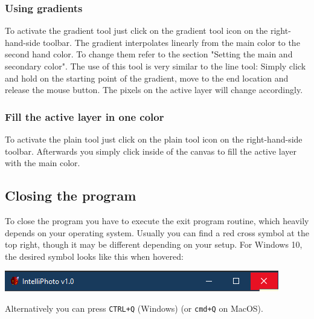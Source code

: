\documentclass[a4paper, 12pt]{article}
\begin{document}
\subsubsection{Using gradients}
To activate the gradient tool just click on the gradient tool icon on the right-hand-side toolbar. The gradient interpolates linearly from the main color to the second hand color. To change them refer to the section "Setting the main and secondary color".
The use of this tool is very similar to the line tool: Simply click and hold on the starting point of the gradient, move to the end location and release the mouse button. The pixels on the active layer will change accordingly.

\subsubsection{Fill the active layer in one color}
To activate the plain tool just click on the plain tool icon on the right-hand-side toolbar.
Afterwards you simply click inside of the canvas to fill the active layer with the main color.

\subsection{Closing the program}
To close the program you have to execute the exit program routine, which heavily depends on your operating system. Usually you can find a red cross symbol at the top right, though it may be different depending on your setup.
For Windows 10, the desired symbol looks like this when hovered:
\begin{center}
\includegraphics[width=0.9\linewidth,keepaspectratio]{assets/close-window}
\end{center}
Alternatively you can press \texttt{CTRL+Q} (Windows) (or \texttt{cmd+Q} on MacOS).
\end{document}
